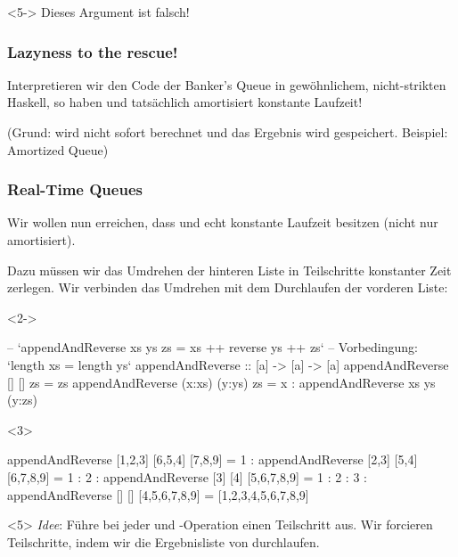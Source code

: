 \documentclass{beamer}
\begin{document}
\begin{frame}[t,fragile]
\begin{onlyenv}<5->
  \vspace{0.5cm}
  {\color{red} Dieses Argument ist falsch!}
\end{onlyenv}
\end{frame}

\begin{frame}[t,fragile]
  \frametitle{Lazyness to the rescue!}

  Interpretieren wir den Code der Banker's Queue in gewöhnlichem, nicht-strikten Haskell, so haben  und  tatsächlich amortisiert konstante Laufzeit!

  (Grund:  wird nicht sofort berechnet und das Ergebnis wird gespeichert. Beispiel: Amortized Queue)
\end{frame}

\begin{frame}[t,fragile]
  \frametitle{Real-Time Queues}
  Wir wollen nun erreichen, dass  und  echt konstante Laufzeit besitzen (nicht nur amortisiert).

  Dazu müssen wir das Umdrehen der hinteren Liste in Teilschritte konstanter Zeit zerlegen.
  Wir verbinden das Umdrehen mit dem Durchlaufen der vorderen Liste:

  \begin{onlyenv}<2->
\begin{haskellcode}
-- `appendAndReverse xs ys zs = xs ++ reverse ys ++ zs`
-- Vorbedingung: `length xs = length ys`
appendAndReverse :: [a] -> [a] -> [a]
appendAndReverse [] [] zs = zs
appendAndReverse (x:xs) (y:ys) zs =
  x : appendAndReverse xs ys (y:zs)
\end{haskellcode}
  \end{onlyenv}

  \begin{onlyenv}<3>
\begin{haskellcode}
  appendAndReverse [1,2,3] [6,5,4] [7,8,9]
= 1 : appendAndReverse [2,3] [5,4] [6,7,8,9]
= 1 : 2 : appendAndReverse [3] [4] [5,6,7,8,9]
= 1 : 2 : 3 : appendAndReverse [] [] [4,5,6,7,8,9]
= [1,2,3,4,5,6,7,8,9]
\end{haskellcode}
  \end{onlyenv}

  \begin{onlyenv}<5>
    \textit{Idee}: Führe bei jeder  und -Operation einen Teilschritt aus.
    Wir forcieren Teilschritte, indem wir die Ergebnisliste von  durchlaufen.
  \end{onlyenv}
\end{frame}
\end{document}
